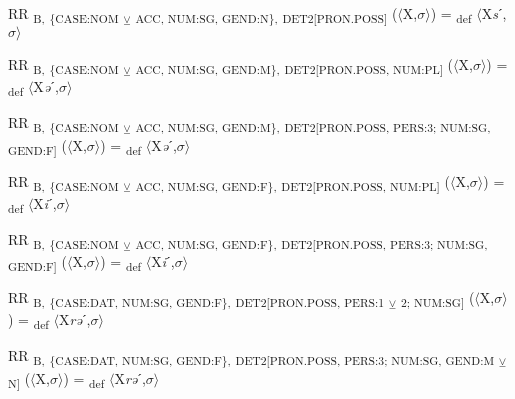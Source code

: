 {\begin{exe}
 RR \textsubscript{B,} \textsubscript{\{CASE:NOM} \textsubscript{${\veebar}$}\textsubscript{ ACC, NUM:SG, GEND:N\},} \textsubscript{DET2[PRON.POSS]} ($\langle$X,$\sigma $$\rangle$) = \textsubscript{def} $\langle$X\textit{s}ˊ,$\sigma $$\rangle$
\end{exe}

\begin{exe}
 RR \textsubscript{B,} \textsubscript{\{CASE:NOM} \textsubscript{${\veebar}$}\textsubscript{ ACC, NUM:SG, GEND:M\},} \textsubscript{DET2[PRON.POSS, NUM:PL]} ($\langle$X,$\sigma $$\rangle$) = \textsubscript{def} $\langle$X\textit{ə}ˊ,$\sigma $$\rangle$
\end{exe}

\begin{exe}
 RR \textsubscript{B,} \textsubscript{\{CASE:NOM} \textsubscript{${\veebar}$}\textsubscript{ ACC, NUM:SG, GEND:M\},} \textsubscript{DET2[PRON.POSS, PERS:3; NUM:SG, GEND:F]} ($\langle$X,$\sigma $$\rangle$) = \textsubscript{def} $\langle$X\textit{ə}ˊ,$\sigma $$\rangle$
\end{exe}

\begin{exe}
 RR \textsubscript{B,} \textsubscript{\{CASE:NOM} \textsubscript{${\veebar}$}\textsubscript{ ACC, NUM:SG, GEND:F\},} \textsubscript{DET2[PRON.POSS, NUM:PL]} ($\langle$X,$\sigma $$\rangle$) = \textsubscript{def} $\langle$X\textit{i}ˊ,$\sigma $$\rangle$
\end{exe}

\begin{exe}
 RR \textsubscript{B,} \textsubscript{\{CASE:NOM} \textsubscript{${\veebar}$}\textsubscript{ ACC, NUM:SG, GEND:F\},} \textsubscript{DET2[PRON.POSS, PERS:3; NUM:SG, GEND:F]} ($\langle$X,$\sigma $$\rangle$) = \textsubscript{def} $\langle$X\textit{i}ˊ,$\sigma $$\rangle$
\end{exe}

\begin{exe}
 RR \textsubscript{B,} \textsubscript{\{CASE:DAT, NUM:SG, GEND:F\},} \textsubscript{DET2[PRON.POSS, PERS:1} \textsubscript{${\veebar}$}\textsubscript{ 2; NUM:SG]} ($\langle$X,$\sigma $$\rangle$) = \textsubscript{def} $\langle$X\textit{rə}ˊ,$\sigma $$\rangle$
\end{exe}

\begin{exe}
 RR \textsubscript{B,} \textsubscript{\{CASE:DAT, NUM:SG, GEND:F\},} \textsubscript{DET2[PRON.POSS, PERS:3; NUM:SG, GEND:M} \textsubscript{${\veebar}$}\textsubscript{ N]} ($\langle$X,$\sigma $$\rangle$) = \textsubscript{def} $\langle$X\textit{rə}ˊ,$\sigma $$\rangle$
\end{exe}

}
